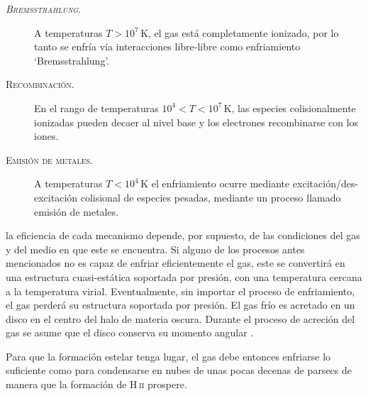 \documentclass{article}
\begin{document}
\begin{description}
%
\item[\textsc{\emph{Bremsstrahlung}.}] A temperaturas $T>10^7\,$K, el gas está completamente
ionizado, por lo tanto se enfría vía interacciones libre-libre como enfriamiento `Bremsstrahlung'.
\item[\textsc{Recombinación.}] En el rango de temperaturas $10^4<T<10^7\,$K, las especies
colisionalmente ionizadas pueden decaer al nivel base y los electrones recombinarse con los iones.
\item[\textsc{Emisión de metales.}] A temperaturas $T<10^4\,$K el enfriamiento ocurre mediante
excitación/des-excitación colisional de especies pesadas, mediante un proceso llamado emisión de
metales.
\end{description}
%
la eficiencia de cada mecanismo depende, por supuesto, de las condiciones del gas y del medio en que
este se encuentra. Si alguno de los procesos antes mencionados no es capaz de enfriar eficientemente
el gas, este se convertirá en una estructura cuasi-estática soportada por presión, con una
temperatura cercana a la temperatura virial. Eventualmente, sin importar el proceso de enfriamiento,
el gas perderá su estructura soportada por presión.
El gas frío es acretado en un disco en el centro del halo de materia oscura.
Durante el proceso de acreción del gas se asume que el disco conserva su momento angular
\citep[véase][]{White1991, Cole2000}.

Para que la formación estelar tenga lugar, el gas debe entonces enfriarse lo suficiente como para
condensarse en nubes de unas pocas decenas de parsecs de manera que la formación de H\,\textsc{ii}
prospere.
\end{document}
